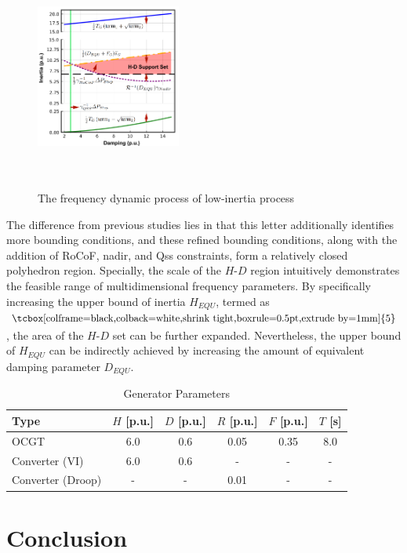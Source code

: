 \documentclass[lettersize,journal]{IEEEtran}
\newcommand{\ciao}[1]{{\setlength\fboxrule{0pt}\fbox{\tcbox[colframe=black,colback=white,shrink tight,boxrule=0.5pt,extrude by=1mm]{\small #1}}}}
\begin{document}
\begin{figure}[h]
  \centering
  \includegraphics[width=0.425\textwidth,height=7.5cm]{inertia_damping_supportset.pdf}
  \caption{The frequency dynamic process of low-inertia process}\vspace{-0.125cm}
  \label{fig:inertia_damping_supportset}
\end{figure}

The difference from previous studies lies in that this letter additionally identifies more bounding conditions, and these refined bounding conditions, along with the addition of RoCoF, nadir, and Qss constraints, form a relatively closed polyhedron region.  Specially, the scale of the $H$-$D$ region intuitively demonstrates the feasible range of multidimensional frequency  parameters. By specifically increasing the upper bound of inertia $H_{EQU}$, termed as $\ciao{5}$, the area of the $H$-$D$ set can be further expanded. Nevertheless, the upper bound of $H_{EQU}$ can be indirectly achieved by increasing the amount of equivalent damping parameter $D_{EQU}$.





\begin{table}[!t]
  \centering
  \caption{Generator Parameters}
  \begin{tabular}{lccccc}
      \hline
      \textbf{Type} & $H$ [p.u.] & $D$ [p.u.] & $R$ [p.u.] & $F$ [p.u.] & $T$ [s] \\
      \hline
      OCGT & 6.0 & 0.6 & 0.05 & 0.35 & 8.0 \\
      Converter (VI) & 6.0 & 0.6 & - & - & - \\
      Converter (Droop) & - & - & 0.01 & - & - \\
      \hline
  \end{tabular}
  \label{tab:generator_parameters}
\end{table}



\section{Conclusion}
\end{document}
